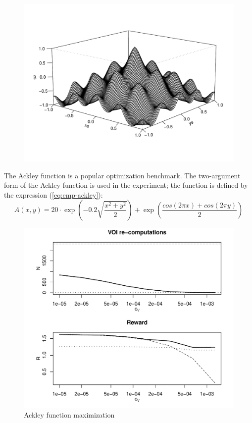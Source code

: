 \begin{figure}[t]
\begin{center}
\includegraphics[scale=0.8,trim=100pt 75pt 100pt 50pt]{ackley.pdf}
\end{center}
\caption{}
\label{fig:ackley-shape}
\end{figure}
The Ackley function \cite{Ackley.function} is a popular optimization
benchmark. The two-argument form of the Ackley function  is used in the
experiment; the function is defined by the expression (\ref{eq:emp-ackley}):
\begin{equation}
\label{eq:emp-ackley}
A(x,y)=20\cdot \exp\left(-0.2\sqrt { \frac {x^2+y^2} 2}\right)+\exp\left(\frac{cos(2\pi x)+cos(2\pi y)} 2\right)
\end{equation}
\begin{figure}[t]
\centering
\includegraphics[scale=0.63]{raticomp-ackley.pdf}
\caption{Ackley function maximization}
\label{fig:ackley-maximization}
\end{figure}
